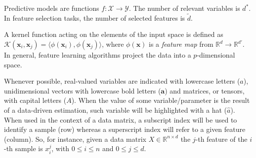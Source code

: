 Predictive models are functions $f: \mathcal{X} \rightarrow \mathcal{Y}$.
The number of relevant variables is $d^*$.
In feature selection tasks, the number of selected features is $\tilde d$.

A kernel function acting on the elements of the input space is defined as $\mathcal{K}(\bm{x}_{i},\bm{x}_{j})=\langle \phi(\bm{x}_{i}), \phi(\bm{x}_{j})\rangle$, where $\phi(\bm{x})$ is a {\em feature map} from $\mathds{R}^d \rightarrow \mathds{R}^{d'}$.
In general, feature learning algorithms project the data into a $p$-dimensional space.

Whenever possible,
real-valued variables are indicated with lowercase letters (\eg $a$),
unidimensional vectors with lowercase bold letters (\eg $\bm{a}$) and
matrices, or tensors, with capital letters (\eg $A$).
When the value of some variable/parameter is the result of a data-driven estimation, such variable will be highlighted with a hat (\eg $\hat a$).
When used in the context of a data matrix, a subscript index will be used to identify a sample (row) whereas a superscript index will refer to a given feature (column).
So, for instance, given a data matrix $X \in \mathbb{R}^{n \times d}$ the $j$-th feature of the $i$-th sample is $x_i^j$, with $0 \leq i \leq n$ and $0\leq j\leq d$.
